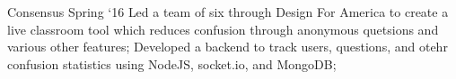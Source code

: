 \project
    {Consensus}
    {Spring `16}
    {
        Led a team of six through Design For America to create a live classroom tool which reduces
        confusion through anonymous quetsions and various other features;
        Developed a backend to track users, questions, and otehr confusion statistics using NodeJS,
        socket.io, and MongoDB;
    }
